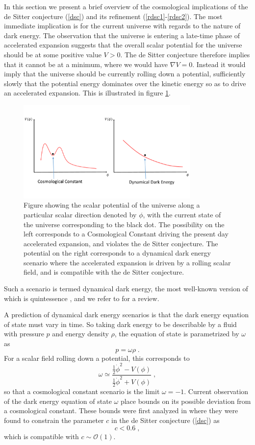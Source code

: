 \documentclass[11pt,a4paper]{article}
\numberwithin{equation}{section}
\numberwithin{table}{section}\setlength{\multlinegap}{25pt}
\newcommand{\cO}{\mathcal{O}}
\newcommand{\be}{\begin{equation}}
\newcommand{\ee}{\end{equation}}
\begin{document}
{In this section we present a brief overview of the cosmological implications of the de Sitter conjecture (\ref{dsc}) and its refinement (\ref{rdsc1}-\ref{rdsc2}). The most immediate implication is for the current universe with regards to the nature of dark energy. The observation that the universe is entering a late-time phase of accelerated expansion suggests that the overall scalar potential for the universe should be at some positive value $V>0$. The de Sitter conjecture therefore implies that it cannot be at a minimum, where we would have $\nabla V=0$. Instead it would imply that the universe should be currently rolling down a potential, sufficiently slowly that the potential energy dominates over the kinetic energy so as to drive an accelerated expansion. This is illustrated in figure \ref{fig:dspotunv}. 
\begin{figure}[t]
\centering
 \includegraphics[width=0.8\textwidth]{dspotunv.pdf}
\caption{Figure showing the scalar potential of the universe along a particular scalar direction denoted by $\phi$, with the current state of the universe corresponding to the black dot. The possibility on the left corresponds to a Cosmological Constant driving the present day accelerated expansion, and violates the de Sitter conjecture. The potential on the right corresponds to a dynamical dark energy scenario where the accelerated expansion is driven by a rolling scalar field, and is compatible with the de Sitter conjecture. }
\label{fig:dspotunv}
\end{figure}
Such a scenario is termed dynamical dark energy, the most well-known version of which is quintessence \cite{WETTERICH1988668,PhysRevD.37.3406}, and we refer to \cite{Copeland:2006wr} for a review. 

A prediction of dynamical dark energy scenarios is that the dark energy equation of state must vary in time. So taking dark energy to be describable by a fluid with pressure $p$ and energy density $\rho$, the equation of state is parametrized by $\omega$ as
\be
p = \omega \rho \;.
\ee
For a scalar field rolling down a potential, this corresponds to
\be
\omega \simeq \frac{\frac12 \dot{\phi}^2 - V\left( \phi \right)}{\frac12 \dot{\phi}^2 + V\left( \phi \right)} \;,
\ee
so that a cosmological constant scenario is the limit $\omega = -1$. Current observation of the dark energy equation of state $\omega$ place bounds on its possible deviation from a cosmological constant. These bounds were first analyzed in \cite{Agrawal:2018own} where they were found to constrain the parameter $c$ in the de Sitter conjecture (\ref{dsc}) as 
\be
c < 0.6 \;,
\ee
which is compatible with $c \sim \cO\left(1\right)$. 

}
\end{document}
